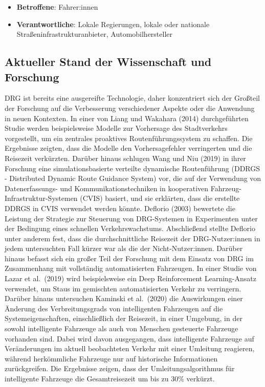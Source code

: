 \documentclass[
]{book}
\providecommand{\tightlist}{%
  \setlength{\itemsep}{0pt}\setlength{\parskip}{0pt}}
\begin{document}
\begin{itemize}
\tightlist
\item
  \textbf{Betroffene}: Fahrer:innen
\item
  \textbf{Verantwortliche}: Lokale Regierungen, lokale oder nationale Straßeninfrastrukturanbieter, Automobilhersteller
\end{itemize}

\hypertarget{aktueller-stand-der-wissenschaft-und-forschung-13}{%
\subsection*{Aktueller Stand der Wissenschaft und Forschung}\label{aktueller-stand-der-wissenschaft-und-forschung-13}}

DRG ist bereits eine ausgereifte Technologie, daher konzentriert sich der Großteil der Forschung auf die Verbesserung verschiedener Aspekte oder die Anwendung in neuen Kontexten. In einer von Liang und Wakahara (2014) durchgeführten Studie werden beispielsweise Modelle zur Vorhersage des Stadtverkehrs vorgestellt, um ein zentrales proaktives Routenführungssystem zu schaffen. Die Ergebnisse zeigten, dass die Modelle den Vorhersagefehler verringerten und die Reisezeit verkürzten. Darüber hinaus schlugen Wang und Niu (2019) in ihrer Forschung eine simulationsbasierte verteilte dynamische Routenführung (DDRGS - Distributed Dynamic Route Guidance System) vor, die auf der Verwendung von Datenerfassungs- und Kommunikationstechniken in kooperativen Fahrzeug-Infrastruktur-Systemen (CVIS) basiert, und sie erklärten, dass die erstellte DDRGS in CVIS verwendet werden könnte. Deflorio (2003) bewertete die Leistung der Strategie zur Steuerung von DRG-Systemen in Experimenten unter der Bedingung eines schnellen Verkehrswachstums. Abschließend stellte Deflorio unter anderem fest, dass die durchschnittliche Reisezeit der DRG-Nutzer:innen in jedem untersuchten Fall kürzer war als die der Nicht-Nutzer:innen. Darüber hinaus befasst sich ein großer Teil der Forschung mit dem Einsatz von DRG im Zusammenhang mit vollständig automatisierten Fahrzeugen. In einer Studie von Lazar et al.~(2019) wird beispielsweise ein Deep Reinforcement Learning-Ansatz verwendet, um Staus im gemischten automatisierten Verkehr zu verringern. Darüber hinaus untersuchen Kaminski et al.~(2020) die Auswirkungen einer Änderung des Verbreitungsgrads von intelligenten Fahrzeugen auf die Systemeigenschaften, einschließlich der Reisezeit, in einer Umgebung, in der sowohl intelligente Fahrzeuge als auch von Menschen gesteuerte Fahrzeuge vorhanden sind. Dabei wird davon ausgegangen, dass intelligente Fahrzeuge auf Veränderungen im aktuell beobachteten Verkehr mit einer Umleitung reagieren, während herkömmliche Fahrzeuge nur auf historische Informationen zurückgreifen. Die Ergebnisse zeigen, dass der Umleitungsalgorithmus für intelligente Fahrzeuge die Gesamtreisezeit um bis zu 30\% verkürzt.
\end{document}
